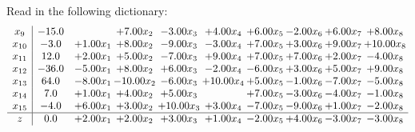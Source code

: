 \documentclass[9pt]{article}
\begin{document}
Read in the following dictionary:
\[\begin{array}{c| c c@{\hskip 2pt} c@{\hskip 2pt} c@{\hskip 2pt} c@{\hskip 2pt} c@{\hskip 2pt} c@{\hskip 2pt} c@{\hskip 2pt} c@{\hskip 2pt} }
 x_{9}   &  -15.0  &   & +  7.00 x_{2} & -3.00 x_{3} & +  4.00 x_{4} & +  6.00 x_{5} & -2.00 x_{6} & +  6.00 x_{7} & +  8.00 x_{8}\\
 x_{10}   &  -3.0 & +  1.00 x_{1} & +  8.00 x_{2} & -9.00 x_{3} & -3.00 x_{4} & +  7.00 x_{5} & +  3.00 x_{6} & +  9.00 x_{7} & + 10.00 x_{8}\\
 x_{11}   &  12.0 & +  2.00 x_{1} & +  5.00 x_{2} & -7.00 x_{3} & +  9.00 x_{4} & +  7.00 x_{5} & +  7.00 x_{6} & +  2.00 x_{7} & -4.00 x_{8}\\
 x_{12}   &  -36.0 & -5.00 x_{1} & +  8.00 x_{2} & +  6.00 x_{3} & -2.00 x_{4} & -6.00 x_{5} & +  3.00 x_{6} & +  5.00 x_{7} & +  9.00 x_{8}\\
 x_{13}   &  64.0 & -8.00 x_{1} & -10.00 x_{2} & -6.00 x_{3} & + 10.00 x_{4} & +  5.00 x_{5} & -1.00 x_{6} & -7.00 x_{7} & -5.00 x_{8}\\
 x_{14}   &  7.0 & +  1.00 x_{1} & +  4.00 x_{2} & +  5.00 x_{3} &   & +  7.00 x_{5} & -3.00 x_{6} & -4.00 x_{7} & -1.00 x_{8}\\
 x_{15}   &  -4.0 & +  6.00 x_{1} & +  3.00 x_{2} & + 10.00 x_{3} & +  3.00 x_{4} & -7.00 x_{5} & -9.00 x_{6} & +  1.00 x_{7} & -2.00 x_{8}\\
\hline
z    &  0.0 & +  2.00 x_{1} & +  2.00 x_{2} & +  3.00 x_{3} & +  1.00 x_{4} & -2.00 x_{5} & +  4.00 x_{6} & -3.00 x_{7} & -3.00 x_{8}\\
\end{array}\]
\end{document}

